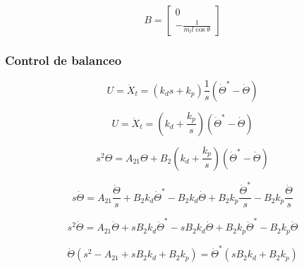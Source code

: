 \documentclass{article}
\begin{document}
            \begin{equation}
                B = \begin{bmatrix}
                    0 \\
                     -\frac{1}{m_l l \cos{\theta}}
                \end{bmatrix}
            \end{equation}







       
        \subsubsection{Control de balanceo}
            \begin{equation}
                U=\ddot{X}_t= \left(k_d s+k_p\right) \frac{1}{s} \left(\dot{\Theta}^*- \dot{\Theta}\right)
            \end{equation}

            \begin{equation}
                U=\ddot{X}_t= \left(k_d +\frac{k_p}{s}\right) \left(\dot{\Theta}^*- \dot{\Theta}\right)
            \end{equation}
            
            \begin{equation}
                 s^2 \Theta = A_{21} \Theta + B_{2} \left(k_d +\frac{k_p}{s}\right) \left(\dot{\Theta}^*- \dot{\Theta}\right)
            \end{equation}

            \begin{equation}
                s \dot{\Theta} = A_{21} \frac{\dot{\Theta}}{s} + B_{2} k_d \dot{\Theta}^* - B_{2} k_d \dot{\Theta}  + B_{2} k_p \frac{\dot{\Theta}^*}{s}  - B_{2} k_p \frac{\dot{\Theta}}{s} 
            \end{equation}

            \begin{equation}
                s^2 \dot{\Theta} = A_{21} \dot{\Theta} + s B_{2} k_d \dot{\Theta}^* - s B_{2} k_d \dot{\Theta}  + B_{2} k_p \dot{\Theta}^* - B_{2} k_p \dot{\Theta}
            \end{equation}

            \begin{equation}
                \dot{\Theta}(s^2 - A_{21} + s B_{2} k_d + B_{2} k_p) = \dot{\Theta}^*(s B_{2} k_d + B_{2} k_p)
            \end{equation}
\end{document}
